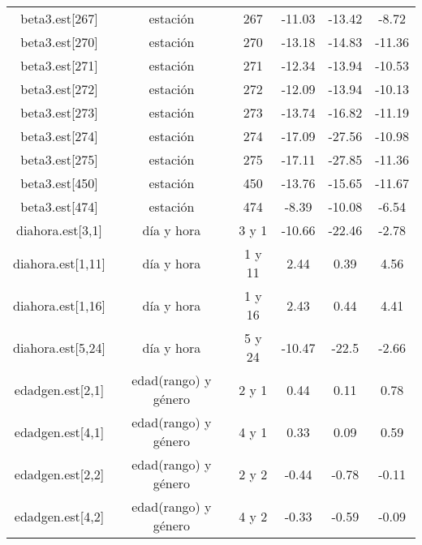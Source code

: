 \begin{table}[]
\begin{tabular}{cccccc}
beta3.est{[}267{]}    & estación             & 267    & -11.03 & -13.42 & -8.72   \\
beta3.est{[}270{]}    & estación             & 270    & -13.18 & -14.83 & -11.36  \\
beta3.est{[}271{]}    & estación             & 271    & -12.34 & -13.94 & -10.53  \\
beta3.est{[}272{]}    & estación             & 272    & -12.09 & -13.94 & -10.13  \\
beta3.est{[}273{]}    & estación             & 273    & -13.74 & -16.82 & -11.19  \\
beta3.est{[}274{]}    & estación             & 274    & -17.09 & -27.56 & -10.98  \\
beta3.est{[}275{]}    & estación             & 275    & -17.11 & -27.85 & -11.36  \\
beta3.est{[}450{]}    & estación             & 450    & -13.76 & -15.65 & -11.67  \\
beta3.est{[}474{]}    & estación             & 474    & -8.39  & -10.08 & -6.54   \\
diahora.est{[}3,1{]}  & día y hora           & 3 y 1  & -10.66 & -22.46 & -2.78   \\
diahora.est{[}1,11{]} & día y hora           & 1 y 11 & 2.44   & 0.39   & 4.56    \\
diahora.est{[}1,16{]} & día y hora           & 1 y 16 & 2.43   & 0.44   & 4.41    \\
diahora.est{[}5,24{]} & día y hora           & 5 y 24 & -10.47 & -22.5  & -2.66   \\
edadgen.est{[}2,1{]}  & edad(rango) y género & 2 y 1  & 0.44   & 0.11   & 0.78    \\
edadgen.est{[}4,1{]}  & edad(rango) y género & 4 y 1  & 0.33   & 0.09   & 0.59    \\
edadgen.est{[}2,2{]}  & edad(rango) y género & 2 y 2  & -0.44  & -0.78  & -0.11   \\
edadgen.est{[}4,2{]}  & edad(rango) y género & 4 y 2  & -0.33  & -0.59  & -0.09  
\end{tabular}
\end{table}